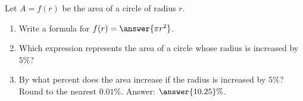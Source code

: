 \documentclass{ximera}
\author{Ivo Terek}
\begin{document}
\begin{exercise}
  Let $A = f(r)$ be the area of a circle of radius $r$.

  \begin{enumerate}[label=\alph*.]
  \item Write a formula for $f(r) = \answer{\pi r^2}$.
  \item Which expression represents the area of a circle whose radius is increased by $5\%$?
    \begin{multipleChoice}
    \end{multipleChoice}
  \item By what percent does the area increase if the radius is increased by $5\%$? Round to the nearest $0.01\%$. Answer: $\answer{10.25}\%$.
  \end{enumerate}

\end{exercise}
\end{document}
